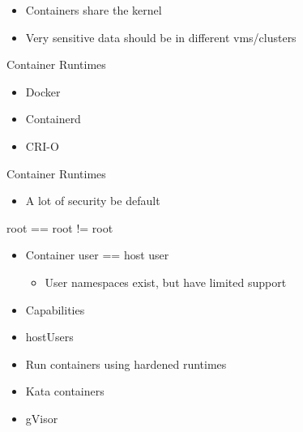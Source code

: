 \documentclass{dcpresentation}
\begin{document}
\begin{frame}
  \begin{itemize}
  \item Containers share the kernel
  \item \alert<2>{Very sensitive data should be in different vms/clusters}
  \end{itemize}
\end{frame}

\begin{frame}{Container Runtimes}
  \begin{itemize}
  \item Docker
  \item Containerd
  \item CRI-O
  \end{itemize}
\end{frame}

\begin{frame}{Container Runtimes}
  \begin{itemize}
  \item A lot of security be default
  \end{itemize}
\end{frame}

\begin{frame}{root == root != root}
  \begin{itemize}
  \item Container user == host user
    \begin{itemize}
    \item User namespaces exist, but have limited support
    \end{itemize}
  \item Capabilities
  \item hostUsers
  \end{itemize}
\end{frame}

\begin{frame}
  \begin{itemize}
  \item Run containers using hardened runtimes
  \item Kata containers
  \item gVisor
  \end{itemize}
\end{frame}
\end{document}
